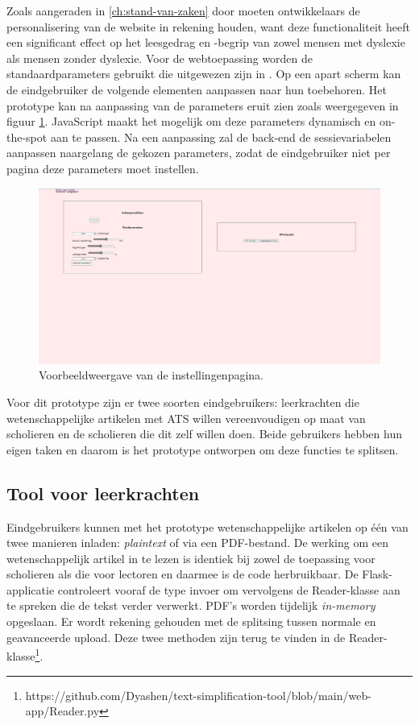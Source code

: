 \medspace

Zoals aangeraden in \ref{ch:stand-van-zaken} door \textcite{Harvard2023} moeten ontwikkelaars de personalisering van de website in rekening houden, want deze functionaliteit heeft een significant effect op het leesgedrag en -begrip van zowel mensen met dyslexie als mensen zonder dyslexie. Voor de webtoepassing worden de standaardparameters gebruikt die uitgewezen zijn in \textcite{Rello2013a, Rello2013b}. Op een apart scherm kan de eindgebruiker de volgende elementen aanpassen naar hun toebehoren. Het prototype kan na aanpassing van de parameters eruit zien zoals weergegeven in figuur \ref{img:website-instellingen}. JavaScript maakt het mogelijk om deze parameters dynamisch en on-the-spot aan te passen. Na een aanpassing zal de back-end de sessievariabelen aanpassen naargelang de gekozen parameters, zodat de eindgebruiker niet per pagina deze parameters moet instellen.

\begin{figure}
	\includegraphics[width=\linewidth]{img/website-instellingen.png}
	\caption{Voorbeeldweergave van de instellingenpagina.}
	\label{img:website-instellingen}
\end{figure}

Voor dit prototype zijn er twee soorten eindgebruikers: leerkrachten die wetenschappelijke artikelen met ATS willen vereenvoudigen op maat van scholieren en de scholieren die dit zelf willen doen. Beide gebruikers hebben hun eigen taken en daarom is het prototype ontworpen om deze functies te splitsen.

\subsection{Tool voor leerkrachten}

\medspace

Eindgebruikers kunnen met het prototype wetenschappelijke artikelen op één van twee manieren inladen: \textit{plaintext} of via een PDF-bestand. De werking om een wetenschappelijk artikel in te lezen is identiek bij zowel de toepassing voor scholieren als die voor lectoren en daarmee is de code herbruikbaar. De Flask-applicatie controleert vooraf de type invoer om vervolgens de Reader-klasse aan te spreken die de tekst verder verwerkt. PDF's worden tijdelijk \textit{in-memory} opgeslaan. Er wordt rekening gehouden met de splitsing tussen normale en geavanceerde upload. Deze twee methoden zijn terug te vinden in de Reader-klasse\footnote{https://github.com/Dyashen/text-simplification-tool/blob/main/web-app/Reader.py}.

